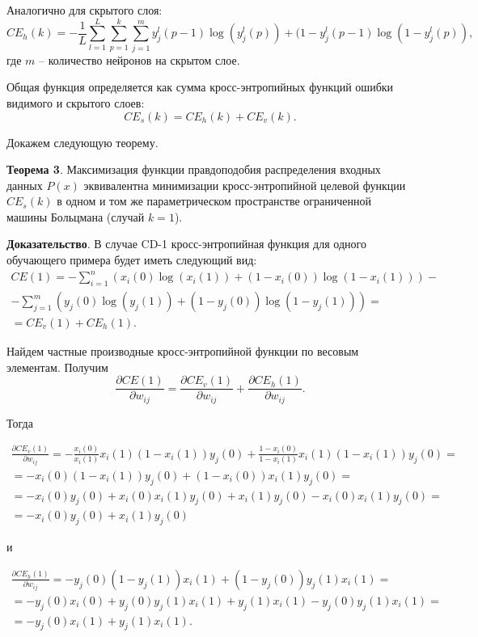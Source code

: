 Аналогично для скрытого слоя:
\begin{equation*}
	CE_h(k) = -\frac{1}{L}\sum_{l=1}^L \sum_{p=1}^k \sum_{j=1}^m y_j^l(p-1)\log(y_j^l(p))+(1-y_j^l(p-1)\log(1-y_j^l(p)),
\end{equation*}
где $m$ -- количество нейронов на скрытом слое.

Общая функция определяется как сумма кросс-энтропийных функций ошибки видимого и скрытого слоев:
\begin{equation}
	CE_s(k) = CE_h(k)+CE_v(k).
\end{equation}

Докажем следующую теорему.

\textbf{Теорема 3}. Максимизация функции правдоподобия распределения входных данных $P(x)$ эквивалентна минимизации кросс-энтропийной целевой функции $CE_s(k)$ в одном и том же параметрическом пространстве ограниченной машины Больцмана (случай $k=1$).

\textbf{Доказательство}. В случае CD-1 кросс-энтропийная функция для одного обучающего примера будет иметь следующий вид:
\begin{multline}
	CE(1) = -\sum_{i=1}^n (x_i(0)\log(x_i(1))+(1-x_i(0))\log(1-x_i(1)))-\\-\sum_{j=1}^m ( y_j(0)\log(y_j(1))+(1-y_j(0))\log(1-y_j(1))) = \\ = CE_v(1)+CE_h(1).
\end{multline}

Найдем частные производные кросс-энтропийной функции по весовым элементам. Получим
\begin{equation*}
	\frac{\partial CE(1)}{\partial w_{ij}} = \frac{\partial CE_v(1)}{\partial w_{ij}} + \frac{\partial CE_h(1)}{\partial w_{ij}}.
\end{equation*}

Тогда

\begin{multline*}
	\frac{\partial CE_v(1)}{\partial w_{ij}} = -\frac{x_i(0)}{x_i(1)}x_i(1)(1-x_i(1))y_j(0)+\frac{1-x_i(0)}{1-x_i(1)}x_i(1)(1-x_i(1))y_j(0) = \\ = -x_i(0)(1-x_i(1))y_j(0)+(1-x_i(0))x_i(1)y_j(0)=\\=-x_i(0)y_j(0)+x_i(0)x_i(1)y_j(0)+x_i(1)y_j(0)-x_i(0)x_i(1)y_j(0)=\\=-x_i(0)y_j(0)+x_i(1)y_j(0) 
\end{multline*}

и

\begin{multline*}
	\frac{\partial CE_h(1)}{\partial w_{ij}} = -y_j(0)(1-y_j(1))x_i(1)+(1-y_j(0))y_j(1)x_i(1) = \\ = -y_j(0)x_i(0)+y_j(0)y_j(1)x_i(1)+y_j(1)x_i(1)-y_j(0)y_j(1)x_i(1) = \\ = -y_j(0)x_i(1)+y_j(1)x_i(1). 
\end{multline*}

